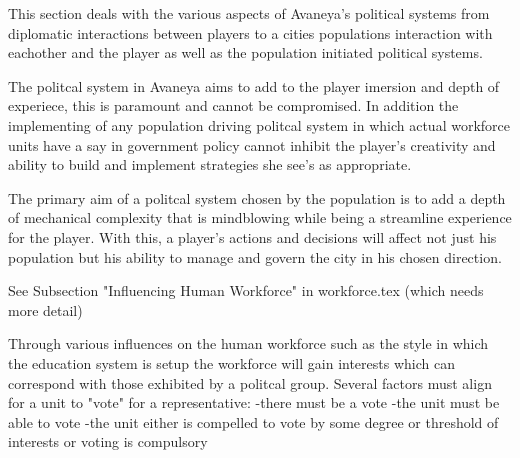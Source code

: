 


This section deals with the various aspects of Avaneya's political systems from diplomatic interactions between players to a cities populations interaction with eachother and the player as well as the population initiated political systems. 


The politcal system in Avaneya aims to add to the player imersion and depth of experiece, this is paramount and cannot be compromised. In addition the implementing of any population driving politcal system in which actual workforce units have a say in government policy cannot inhibit the player's creativity and ability to build and implement strategies she see's as appropriate.

The primary aim of a politcal system chosen by the population is to add a depth of mechanical complexity that is mindblowing while being a streamline experience for the player. With this, a player's actions and decisions will affect not just his population but his ability to manage and govern the city in his chosen direction.

See Subsection "Influencing Human Workforce" in workforce.tex (which needs more detail)

Through various influences on the human workforce such as the style in which the education system is setup the workforce will gain interests which can correspond with those exhibited by a politcal group. Several factors must align for a unit to "vote" for a representative:
-there must be a vote
-the unit must be able to vote
-the unit either is compelled to vote by some degree or threshold of interests or voting is compulsory













